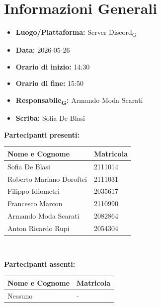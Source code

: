 \section{Informazioni Generali}
\begin{itemize}
	\item \textbf{Luogo/Piattaforma:} Server Discord\textsubscript{G}
	\item \textbf{Data:} 2026-05-26
	\item \textbf{Orario di inizio:} 14:30
	\item \textbf{Orario di fine:} 15:50
	\item \textbf{Responsabile\textsubscript{G}:} Armando Moda Scarati
	\item \textbf{Scriba:} Sofia De Blasi
\end{itemize}

\vspace{0.5cm}
\textbf{Partecipanti presenti:}
\begin{table}[ht]
	\centering
	\renewcommand{\arraystretch}{1.2}
	\begin{tabularx}{\textwidth}{X l}
		\toprule
		\textbf{Nome e Cognome} & \textbf{Matricola} \\
		\midrule
		Sofia De Blasi & 2111014 \\
		Roberto Mariano Doroftei & 2111031 \\
		Filippo Idiometri & 2035617 \\
		Francesco Marcon & 2110990 \\
		Armando Moda Scarati & 2082864 \\
		Anton Ricardo Rupi & 2054304 \\
		\bottomrule
	\end{tabularx}
\\ \end{table}

\vspace{0.5cm}
\textbf{Partecipanti assenti:}
\begin{table}[ht]
	\centering
	\renewcommand{\arraystretch}{1.2}
	\begin{tabularx}{\textwidth}{X l}
		\toprule
		\textbf{Nome e Cognome} & \textbf{Matricola} \\
		\midrule
		Nessuno & - \\
		\bottomrule
	\end{tabularx}
\end{table}

